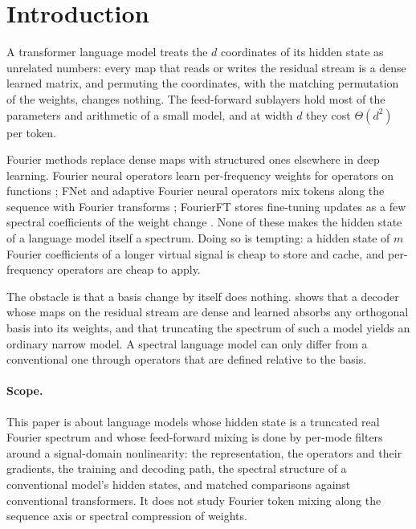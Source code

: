 
\section{Introduction}
\label{sec:intro}

A transformer language model \citep{vaswani2017attention} treats the $d$
coordinates of its hidden state as unrelated numbers: every map that reads or
writes the residual stream is a dense learned matrix, and permuting the
coordinates, with the matching permutation of the weights, changes nothing.
The feed-forward sublayers hold most of the parameters and arithmetic of a
small model, and at width $d$ they cost $\Theta(d^2)$ per token.

Fourier methods replace dense maps with structured ones elsewhere in deep
learning. Fourier neural operators learn per-frequency weights for operators
on functions \citep{li2020fno}; FNet and adaptive Fourier neural operators mix
tokens along the sequence with Fourier transforms \citep{leethorp2021fnet,
guibas2021afno}; FourierFT stores fine-tuning updates as a few spectral
coefficients of the weight change \citep{gao2024fourierft}. None of these makes
the hidden state of a language model itself a spectrum. Doing so is tempting:
a hidden state of $m$ Fourier coefficients of a longer virtual signal is
cheap to store and cache, and per-frequency operators are cheap to apply.

The obstacle is that a basis change by itself does nothing.
 shows that a decoder whose maps on the residual stream
are dense and learned absorbs any orthogonal basis into its weights, and that
truncating the spectrum of such a model yields an ordinary narrow model. A
spectral language model can only differ from a conventional one through
operators that are defined relative to the basis.

\paragraph{Scope.} This paper is about language models whose hidden state is
a truncated real Fourier spectrum and whose feed-forward mixing is done by
per-mode filters around a signal-domain nonlinearity: the representation, the
operators and their gradients, the training and decoding path, the spectral
structure of a conventional model's hidden states, and matched comparisons
against conventional transformers. It does not study Fourier token mixing
along the sequence axis or spectral compression of weights.

